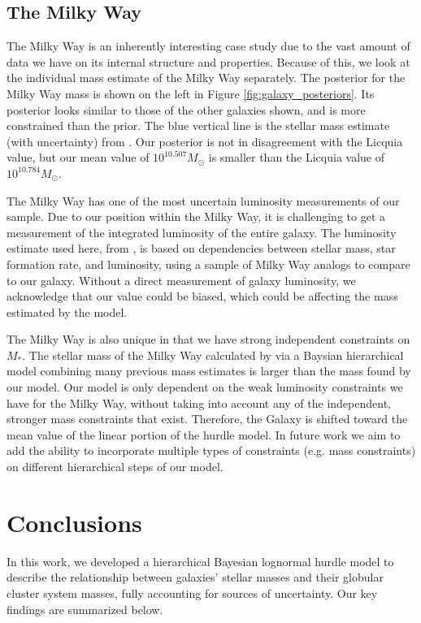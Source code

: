 \documentclass[twocolumn]{aastex631}
\begin{document}
\subsection{The Milky Way}

The Milky Way is an inherently interesting case study due to the vast amount of data we have on its internal structure and properties. Because of this, we look at the individual mass estimate of the Milky Way separately. The posterior for the Milky Way mass is shown on the left in Figure \ref{fig:galaxy_posteriors}. Its posterior looks similar to those of the other galaxies shown, and is more constrained than the prior. The blue vertical line is the stellar mass estimate (with uncertainty) from \citet{Licquia2015b}. Our posterior is not in disagreement with the Licquia value, but our mean value of $10^{10.507}M_\odot$ is smaller than the Licquia value of $10^{10.784}M_\odot$.


The Milky Way has one of the most uncertain luminosity measurements of our sample. Due to our position within the Milky Way, it is challenging to get a measurement of the integrated luminosity of the entire galaxy. The luminosity estimate used here, from \citet{Licquia2015}, is based on dependencies between stellar mass, star formation rate, and luminosity, using a sample of Milky Way analogs to compare to our galaxy. Without a direct measurement of galaxy luminosity, we acknowledge that our value could be biased, which could be affecting the mass estimated by the model.

The Milky Way is also unique in that we have strong independent constraints on $M_*$. The stellar mass of the Milky Way calculated by \citet{Licquia2015b} via a Baysian hierarchical model combining many previous mass estimates is larger than the mass found by our model. Our model is only dependent on the weak luminosity constraints we have for the Milky Way, without taking into account any of the independent, stronger mass constraints that exist. Therefore, the Galaxy is shifted toward the mean value of the linear portion of the hurdle model. In future work we aim to add the ability to incorporate multiple types of constraints (e.g. mass constraints) on different hierarchical steps of our model. 


\section{Conclusions} \label{sec:conc}

In this work, we developed a hierarchical Bayesian lognormal hurdle model to describe the relationship between galaxies' stellar masses and their globular cluster system masses, fully accounting for sources of uncertainty. Our key findings are summarized below. 
\end{document}
